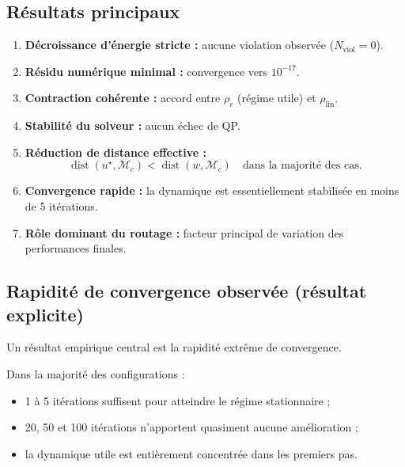 \documentclass[11pt,a4paper]{article}
\newcommand{\1}{\mathbf 1}
\begin{document}
\subsection{Résultats principaux}

\begin{enumerate}[leftmargin=2em]
\item \textbf{Décroissance d’énergie stricte :} aucune violation observée (\(N_{\mathrm{viol}}=0\)).

\item \textbf{Résidu numérique minimal :} convergence vers \(10^{-17}\).

\item \textbf{Contraction cohérente :} accord entre \(\rho_r\) (régime utile) et \(\rho_{\mathrm{lin}}\).

\item \textbf{Stabilité du solveur :} aucun échec de QP.

\item \textbf{Réduction de distance effective :}
\[
\operatorname{dist}(u^\star,\mathcal M_c)
<
\operatorname{dist}(w,\mathcal M_c)
\quad \text{dans la majorité des cas.}
\]

\item \textbf{Convergence rapide :} la dynamique est essentiellement stabilisée en moins de 5 itérations.

\item \textbf{Rôle dominant du routage :} facteur principal de variation des performances finales.
\end{enumerate}

\subsection{Rapidité de convergence observée (résultat explicite)}

Un résultat empirique central est la rapidité extrême de convergence.

Dans la majorité des configurations :

\begin{itemize}
\item 1 à 5 itérations suffisent pour atteindre le régime stationnaire ;
\item 20, 50 et 100 itérations n’apportent quasiment aucune amélioration ;
\item la dynamique utile est entièrement concentrée dans les premiers pas.
\end{itemize}
\end{document}
